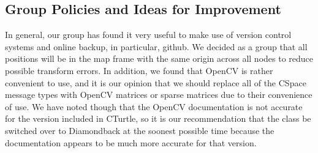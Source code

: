 \documentclass{article}
\begin{document}
\subsection{Group Policies and Ideas for Improvement}

In general, our group has found it very useful to make use of version control systems and online backup, in particular, github.
We decided as a group that all positions will be in the map frame with the same origin across all nodes to reduce possible transform errors.
In addition, we found that OpenCV is rather convenient to use, and it is our opinion that we should replace all of the CSpace message types with OpenCV matrices or sparse matrices due to their convenience of use.
We have noted though that the OpenCV documentation is not accurate for the version included in CTurtle, so it is our recommendation that the class be switched over to Diamondback at the soonest possible time because the documentation appears to be much more accurate for that version.
\end{document}
